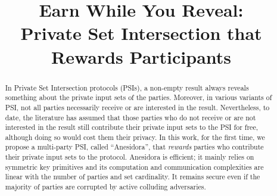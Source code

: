 \documentclass[runningheads]{llncs}
\newcommand{\withRew}{{Anesidora}\xspace}
\begin{document}
  \setlength\abovedisplayskip{0pt}
  \setlength\belowdisplayskip{0pt}


\newenvironment{packed_item}{
\begin{itemize}
	\setlength{\topsep}{0pt}
	\setlength{\partopsep}{0pt}
  \setlength{\itemsep}{0pt}
  \setlength{\parskip}{0pt}
  \setlength{\parsep}{0pt}
}{\end{itemize}}

\newenvironment{packed_enum}{
\begin{enumerate}
	\setlength{\topsep}{0pt}
	\setlength{\partopsep}{0pt}
  \setlength{\itemsep}{0pt}
  \setlength{\parskip}{0pt}
  \setlength{\parsep}{0pt}
}{\end{enumerate}}




\title{Earn While You Reveal: \\ Private Set Intersection that\\ Rewards Participants}
%



\author{}
\institute{}
\date{}
\maketitle{}


\begin{abstract}
In Private Set Intersection protocols (PSIs), a non-empty result always reveals something about the private input sets of the parties. Moreover, in various variants of PSI, not all parties necessarily receive or are interested in the result. Nevertheless, to date, the literature has assumed that those parties who do not receive or are not interested in the result still contribute their private input sets to the PSI for free, although doing so would cost them their privacy. In this work, for the first time, we propose a multi-party PSI, called ``\withRew'', that \emph{rewards} parties who contribute their private input sets to the protocol.  %
\withRew is efficient; it mainly relies on symmetric key primitives and its computation and communication complexities are linear with the number of parties and set cardinality. It remains secure even if the majority of parties are corrupted by active colluding adversaries.





\end{abstract}
 
 


\appendix






%
%
%
\end{document}
